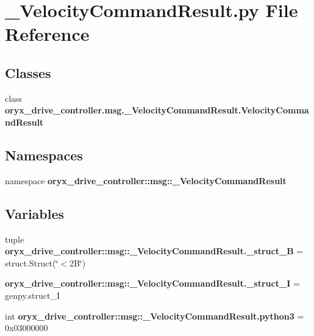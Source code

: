 \section{\-\_\-\-Velocity\-Command\-Result.\-py \-File \-Reference}
\label{__VelocityCommandResult_8py}
\subsection*{\-Classes}
\begin{DoxyCompactItemize}
\item 
class {\bf oryx\-\_\-drive\-\_\-controller.\-msg.\-\_\-\-Velocity\-Command\-Result.\-Velocity\-Command\-Result}
\end{DoxyCompactItemize}
\subsection*{\-Namespaces}
\begin{DoxyCompactItemize}
\item 
namespace {\bf oryx\-\_\-drive\-\_\-controller\-::msg\-::\-\_\-\-Velocity\-Command\-Result}
\end{DoxyCompactItemize}
\subsection*{\-Variables}
\begin{DoxyCompactItemize}
\item 
tuple {\bf oryx\-\_\-drive\-\_\-controller\-::msg\-::\-\_\-\-Velocity\-Command\-Result.\-\_\-struct\-\_\-B} = struct.\-Struct(\char`\"{}$<$2\-B\char`\"{})
\item 
{\bf oryx\-\_\-drive\-\_\-controller\-::msg\-::\-\_\-\-Velocity\-Command\-Result.\-\_\-struct\-\_\-\-I} = genpy.\-struct\-\_\-\-I
\item 
int {\bf oryx\-\_\-drive\-\_\-controller\-::msg\-::\-\_\-\-Velocity\-Command\-Result.\-python3} = 0x03000000
\end{DoxyCompactItemize}
